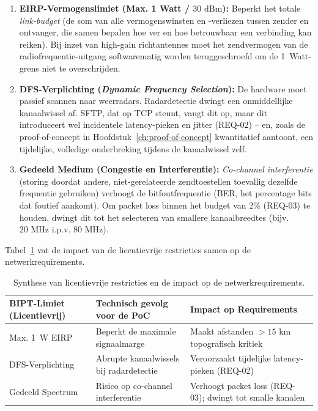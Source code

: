 \begin{enumerate}
    \item \textbf{EIRP-Vermogenslimiet (Max. 1 Watt / $30\text{ dBm}$):} Beperkt het totale \textit{link-budget} (de som van alle vermogenswinsten en -verliezen tussen zender en ontvanger, die samen bepalen hoe ver en hoe betrouwbaar een verbinding kan reiken). Bij inzet van high-gain richtantennes moet het zendvermogen van de radiofrequentie-uitgang softwarematig worden teruggeschroefd om de 1~Watt-grens niet te overschrijden.
    \item \textbf{DFS-Verplichting (\textit{Dynamic Frequency Selection}):} De hardware moet passief scannen naar weerradars. Radardetectie dwingt een onmiddellijke kanaalwissel af. SFTP, dat op TCP steunt, vangt dit op, maar dit introduceert wel incidentele latency-pieken en jitter (REQ-02) -- en, zoals de proof-of-concept in Hoofdstuk~\ref{ch:proof-of-concept} kwantitatief aantoont, een tijdelijke, volledige onderbreking tijdens de kanaalwissel zelf.
    \item \textbf{Gedeeld Medium (Congestie en Interferentie):} \textit{Co-channel interferentie} (storing doordat andere, niet-gerelateerde zendtoestellen toevallig dezelfde frequentie gebruiken) verhoogt de bitfoutfrequentie (BER, het percentage bits dat foutief aankomt). Om packet loss binnen het budget van 2\% (REQ-03) te houden, dwingt dit tot het selecteren van smallere kanaalbreedtes (bijv. $20\text{ MHz}$ i.p.v. $80\text{ MHz}$).
\end{enumerate}

Tabel~\ref{tab:limiet-impact-matrix} vat de impact van de licentievrije restricties samen op de netwerkrequirements.

\begin{table}[h]
    \centering
    \small
    \begin{tabular}{lll}
        \toprule
        \textbf{BIPT-Limiet (Licentievrij)} & \textbf{Technisch gevolg voor de PoC} & \textbf{Impact op Requirements} \\
        \midrule
        Max. 1~W EIRP & Beperkt de maximale signaalmarge & Maakt afstanden $>15\text{ km}$ topografisch kritiek \\
        DFS-Verplichting & Abrupte kanaalwissels bij radardetectie & Veroorzaakt tijdelijke latency-pieken (REQ-02) \\
        Gedeeld Spectrum & Risico op co-channel interferentie & Verhoogt packet loss (REQ-03); dwingt tot smalle kanalen \\
        \bottomrule
    \end{tabular}
    \caption{Synthese van licentievrije restricties en de impact op de netwerkrequirements.}
    \label{tab:limiet-impact-matrix}
\end{table}

